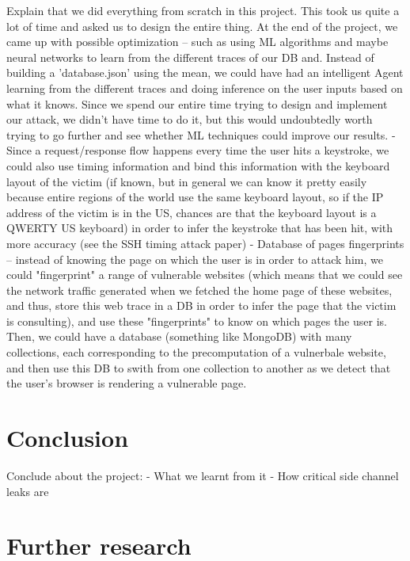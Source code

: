 \documentclass[journal]{IEEEtran}
\begin{document}
Explain that we did everything from scratch in this project. This took us quite a lot of time and asked us to design the entire thing. At the end of the project, we came up with possible optimization -- such as using ML algorithms and maybe neural networks to learn from the different traces of our DB and. Instead of building a 'database.json' using the mean, we could have had an intelligent Agent learning from the different traces and doing inference on the user inputs based on what it knows. Since we spend our entire time trying to design and implement our attack, we didn't have time to do it, but this would undoubtedly worth trying to go further and see whether ML techniques could improve our results.
- Since a request/response flow happens every time the user hits a keystroke, we could also use timing information and bind this information with the keyboard layout of the victim (if known, but in general we can know it pretty easily because entire regions of the world use the same keyboard layout, so if the IP address of the victim is in the US, chances are that the keyboard layout is a QWERTY US keyboard) in order to infer the keystroke that has been hit, with more accuracy (see the SSH timing attack paper)
- Database of pages fingerprints -- instead of knowing the page on which the user is in order to attack him, we could "fingerprint" a range of vulnerable websites (which means that we could see the network traffic generated when we fetched the home page of these websites, and thus, store this web trace in a DB in order to infer the page that the victim is consulting), and use these "fingerprints" to know on which pages the user is. Then, we could have a database (something like MongoDB) with many collections, each corresponding to the precomputation of a vulnerbale website, and then use this DB to swith from one collection to another as we detect that the user's browser is rendering a vulnerable page.

\section{Conclusion}

Conclude about the project:
- What we learnt from it
- How critical side channel leaks are


\section{Further research}
\end{document}
